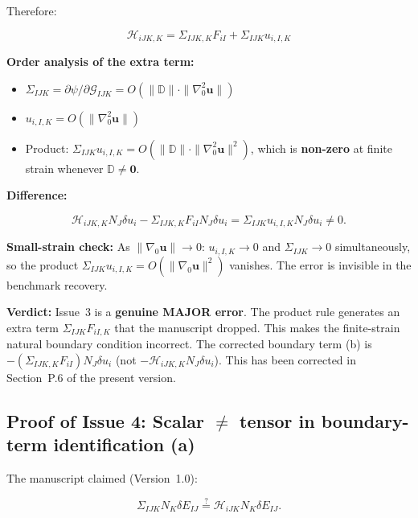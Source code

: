\documentclass[11pt]{article}
\begin{document}
Therefore:

\begin{equation}
\boxed{\mathcal{H}_{iJK,K} = \Sigma_{IJK,K}F_{iI} + \Sigma_{IJK}u_{i,I,K}}
\label{app:exact_H_div}
\end{equation}

\textbf{Order analysis of the extra term:}
\begin{itemize}
\item $\Sigma_{IJK}=\partial\psi/\partial\mathcal{G}_{IJK}=O(\|\mathbb{D}\|\cdot\|\nabla_0^2\mathbf{u}\|)$
\item $u_{i,I,K}=O(\|\nabla_0^2\mathbf{u}\|)$
\item Product: $\Sigma_{IJK}u_{i,I,K}=O(\|\mathbb{D}\|\cdot\|\nabla_0^2\mathbf{u}\|^2)$, which is \textbf{non-zero} at finite strain whenever $\mathbb{D}\neq\mathbf{0}$.
\end{itemize}

\textbf{Difference:}

\begin{equation}
\mathcal{H}_{iJK,K}N_J\delta u_i - \Sigma_{IJK,K}F_{iI}N_J\delta u_i
= \Sigma_{IJK}u_{i,I,K}N_J\delta u_i \neq 0.
\end{equation}

\textbf{Small-strain check:} As $\|\nabla_0\mathbf{u}\|\to0$: $u_{i,I,K}\to 0$ and $\Sigma_{IJK}\to 0$ simultaneously, so the product $\Sigma_{IJK}u_{i,I,K}=O(\|\nabla_0\mathbf{u}\|^2)$ vanishes. The error is invisible in the benchmark recovery.

\textbf{Verdict:} Issue~3 is a \textbf{genuine MAJOR error}. The product rule generates an extra term $\Sigma_{IJK}F_{iI,K}$ that the manuscript dropped. This makes the finite-strain natural boundary condition incorrect. The corrected boundary term (b) is $-(\Sigma_{IJK,K}F_{iI})N_J\delta u_i$ (not $-\mathcal{H}_{iJK,K}N_J\delta u_i$). This has been corrected in Section~P.6 of the present version.

\subsection{Proof of Issue 4: Scalar $\neq$ tensor in boundary-term identification (a)}
\label{app:proof4}

The manuscript claimed (Version~1.0):

\begin{equation}
\Sigma_{IJK}N_K\delta E_{IJ}
\stackrel{?}{=}
\mathcal{H}_{iJK}N_K\delta E_{IJ}.
\label{app:claim4}
\end{equation}
\end{document}
